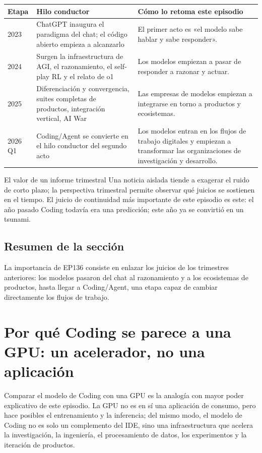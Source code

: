\documentclass[a4paper]{article}
\begin{document}
\noindent\begin{longtable}{p{}p{}p{}}
\toprule
Etapa & Hilo conductor & Cómo lo retoma este episodio \\
\midrule
2023 & ChatGPT inaugura el paradigma del chat; el código abierto empieza a alcanzarlo & El primer acto es «el modelo sabe hablar y sabe responder». \\
2024 & Surgen la infraestructura de AGI, el razonamiento, el self-play RL y el relato de o1 & Los modelos empiezan a pasar de responder a razonar y actuar. \\
2025 & Diferenciación y convergencia, suites completas de productos, integración vertical, AI War & Las empresas de modelos empiezan a integrarse en torno a productos y ecosistemas. \\
2026 Q1 & Coding/Agent se convierte en el hilo conductor del segundo acto & Los modelos entran en los flujos de trabajo digitales y empiezan a transformar las organizaciones de investigación y desarrollo. \\
\bottomrule
\end{longtable}

\begin{importantbox}{El valor de un informe trimestral}
Una noticia aislada tiende a exagerar el ruido de corto plazo; la perspectiva trimestral permite observar qué juicios se sostienen en el tiempo. El juicio de continuidad más importante de este episodio es este: el año pasado Coding todavía era una predicción; este año ya se convirtió en un tsunami.
\end{importantbox}

\subsection{Resumen de la sección}

La importancia de EP136 consiste en enlazar los juicios de los trimestres anteriores: los modelos pasaron del chat al razonamiento y a los ecosistemas de productos, hasta llegar a Coding/Agent, una etapa capaz de cambiar directamente los flujos de trabajo.
\section{Por qué Coding se parece a una GPU: un acelerador, no una aplicación}

Comparar el modelo de Coding con una GPU es la analogía con mayor poder explicativo de este episodio. La GPU no es en sí una aplicación de consumo, pero hace posibles el entrenamiento y la inferencia; del mismo modo, el modelo de Coding no es solo un complemento del IDE, sino una infraestructura que acelera la investigación, la ingeniería, el procesamiento de datos, los experimentos y la iteración de productos.
\end{document}
